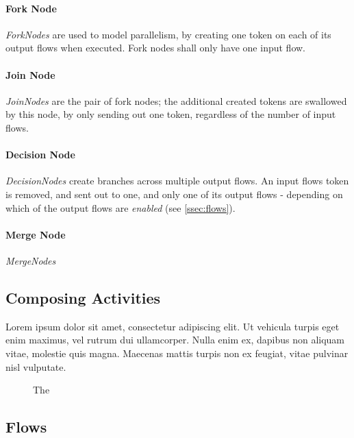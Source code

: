 \paragraph{Fork Node}

\emph{ForkNodes} are used to model parallelism, by creating one token on each of its output flows when executed. Fork nodes shall only have one input flow.

\paragraph{Join Node}

\emph{JoinNodes} are the pair of fork nodes; the additional created tokens are swallowed by this node, by only sending out one token, regardless of the number of input flows.

\paragraph{Decision Node}

\emph{DecisionNodes} create branches across multiple output flows. An input flows token is removed, and sent out to one, and only one of its output flows - depending on which of the output flows are \emph{enabled} (see \autoref{ssec:flows}).

\paragraph{Merge Node}

\emph{MergeNodes} 

\subsection{Composing Activities}

Lorem ipsum dolor sit amet, consectetur adipiscing elit. Ut vehicula turpis eget enim maximus, vel rutrum dui ullamcorper. Nulla enim ex, dapibus non aliquam vitae, molestie quis magna. Maecenas mattis turpis non ex feugiat, vitae pulvinar nisl vulputate.

\begin{figure}[!ht]
\centering

\caption{The }
\label{fig:composite_activity}
\end{figure}

\subsection{Flows}\label{ssec:flows}

